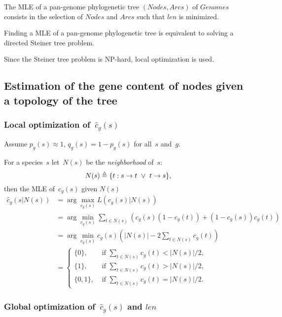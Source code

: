 \documentclass[10pt,a4paper]{article}
\theoremstyle{plain} \newtheorem{Lem}{Lemma}
\begin{document}
The MLE of a pan-genome phylogenetic tree $(Nodes,Arcs)$ of $Genomes$ consists in
the selection of $Nodes$ and $Arcs$ 
such that $len$ is minimized.

Finding a MLE of a pan-genome phylogenetic tree is equivalent to solving a directed Steiner tree problem.

Since the Steiner tree problem is NP-hard, local optimization is used.




\subsection {Estimation of the gene content of nodes given a topology of the tree}


\subsubsection{Local optimization of~$\hat c_g(s)$}

Assume $p_g(s) \approx 1$, $q_g(s) = 1 - p_g(s)$ for all~$s$ and~$g$.

For a species~$s$ let~$N(s)$ be the {\em neighborhood} of~$s$:
$$ N(s) \triangleq \{t: s \to t \ \vee \  t \to s\}, $$
then 
the MLE of~$c_g(s)$ given $N(s)$
\begin{equation*}
\begin{split}
\hat c_g(s|N(s)) &= \arg \max_{c_g(s)} L(c_g(s)|N(s)) \\
   &= \arg \min_{c_g(s)} \sum_{t \in N(s)} (c_g(s) (1-c_g(t)) + (1-c_g(s)) c_g(t)) \\
   &= \arg \min_{c_g(s)} c_g(s) \left(|N(s)| - 2 \sum_{t \in N(s)} c_g(t) \right) \\
   &= 
  \begin{cases}
    \{0\},   &\text{ if } \sum_{t \in N(s)} c_g(t) < |N(s)|/2,\\
    \{1\},   &\text{ if } \sum_{t \in N(s)} c_g(t) > |N(s)|/2,\\
    \{0,1\}, &\text{ if } \sum_{t \in N(s)} c_g(t) = |N(s)|/2.
  \end{cases}   
\end{split}
\end{equation*}



\subsubsection{Global optimization of~$\hat c_g(s)$ and $len$}
\end{document}
